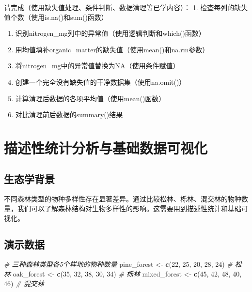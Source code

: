 \documentclass[
]{book}
\newenvironment{Shaded}{\begin{snugshade}}{\end{snugshade}}
\newcommand{\CommentTok}[1]{\textcolor[rgb]{0.56,0.35,0.01}{\textit{#1}}}
\newcommand{\DecValTok}[1]{\textcolor[rgb]{0.00,0.00,0.81}{#1}}
\newcommand{\FunctionTok}[1]{\textcolor[rgb]{0.13,0.29,0.53}{\textbf{#1}}}
\newcommand{\NormalTok}[1]{#1}
\newcommand{\OtherTok}[1]{\textcolor[rgb]{0.56,0.35,0.01}{#1}}
\begin{document}
请完成（使用缺失值处理、条件判断、数据清理等已学内容）：
1. 检查每列的缺失值个数（使用is.na()和sum()函数）

\begin{enumerate}
\def\labelenumi{\arabic{enumi}.}
\setcounter{enumi}{1}
\item
  识别nitrogen\_mg列中的异常值（使用逻辑判断和which()函数）
\item
  用均值填补organic\_matter的缺失值（使用mean()和na.rm参数）
\item
  将nitrogen\_mg中的异常值替换为NA（使用条件赋值）
\item
  创建一个完全没有缺失值的干净数据集（使用na.omit()）
\item
  计算清理后数据的各项平均值（使用mean()函数）
\item
  对比清理前后数据的summary()结果
\end{enumerate}

\hypertarget{ux63cfux8ff0ux6027ux7edfux8ba1ux5206ux6790ux4e0eux57faux7840ux6570ux636eux53efux89c6ux5316}{%
\section{描述性统计分析与基础数据可视化}\label{ux63cfux8ff0ux6027ux7edfux8ba1ux5206ux6790ux4e0eux57faux7840ux6570ux636eux53efux89c6ux5316}}

\hypertarget{ux751fux6001ux5b66ux80ccux666f-6}{%
\subsection{生态学背景}\label{ux751fux6001ux5b66ux80ccux666f-6}}

不同森林类型的物种多样性存在显著差异。通过比较松林、栎林、混交林的物种数量，我们可以了解森林结构对生物多样性的影响。这需要用到描述性统计和基础可视化。

\hypertarget{ux6f14ux793aux6570ux636e-5}{%
\subsection{演示数据}\label{ux6f14ux793aux6570ux636e-5}}

\begin{Shaded}
\begin{Highlighting}[]
\CommentTok{\# 三种森林类型各5个样地的物种数量}
\NormalTok{pine\_forest }\OtherTok{\textless{}{-}} \FunctionTok{c}\NormalTok{(}\DecValTok{22}\NormalTok{, }\DecValTok{25}\NormalTok{, }\DecValTok{20}\NormalTok{, }\DecValTok{28}\NormalTok{, }\DecValTok{24}\NormalTok{)      }\CommentTok{\# 松林}
\NormalTok{oak\_forest }\OtherTok{\textless{}{-}} \FunctionTok{c}\NormalTok{(}\DecValTok{35}\NormalTok{, }\DecValTok{32}\NormalTok{, }\DecValTok{38}\NormalTok{, }\DecValTok{30}\NormalTok{, }\DecValTok{34}\NormalTok{)       }\CommentTok{\# 栎林  }
\NormalTok{mixed\_forest }\OtherTok{\textless{}{-}} \FunctionTok{c}\NormalTok{(}\DecValTok{45}\NormalTok{, }\DecValTok{42}\NormalTok{, }\DecValTok{48}\NormalTok{, }\DecValTok{40}\NormalTok{, }\DecValTok{46}\NormalTok{)     }\CommentTok{\# 混交林}
\end{Highlighting}
\end{Shaded}
\end{document}
